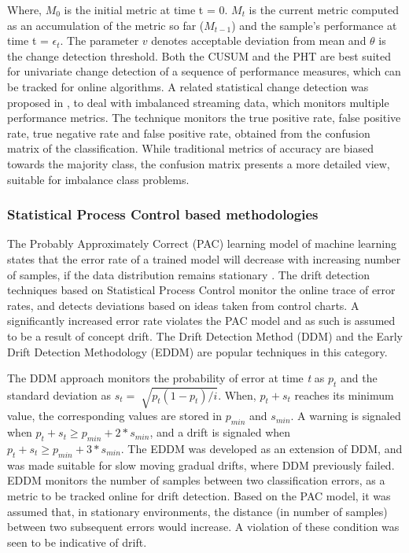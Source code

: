 \documentclass[authoryear,3p,times,twocolumn]{elsarticle}
\begin{document}
Where, $M_0$ is the initial metric at time t = 0. $M_t$ is the current metric computed as an accumulation of the metric so far ($M_{t-1}$) and the sample's performance at time t = $\epsilon_t$. The parameter $v$ denotes acceptable deviation from mean and $\theta$ is the change detection threshold. Both the CUSUM and the PHT are best suited for univariate change detection of a sequence of performance measures, which can be tracked for online algorithms. A related statistical change detection was proposed in \citep{wang2015concept}, to deal with imbalanced streaming data, which monitors multiple performance metrics. The technique monitors the true positive rate, false positive rate, true negative rate and false positive rate, obtained from the confusion matrix of the classification. While traditional metrics of accuracy are biased towards the majority class, the confusion matrix presents a more detailed view, suitable for imbalance class problems. 

\subsubsection{Statistical Process Control based methodologies}
\label{sec:lr_spc}

The Probably Approximately Correct (PAC) learning model of machine learning states that the error rate of a trained model will decrease with increasing number of samples, if the data distribution remains stationary \citep{haussler1990probably}. The drift detection techniques based on Statistical Process Control monitor the online trace of error rates, and detects deviations based on ideas taken from control charts. A significantly increased error rate violates the PAC model and as such is assumed to be a result of concept drift. The Drift Detection Method (DDM) \citep{gama2004learning} and the Early Drift Detection Methodology (EDDM) \citep{baena2006early} are popular techniques in this category. 

The DDM approach monitors the probability of error at time \textit{t} as $p_t$ and the standard deviation as $s_t=\sqrt[]{p_t(1-p_t)/i}$. When, $p_t+s_t$ reaches its minimum value, the corresponding values are stored in $p_{min}$ and $s_{min}$. A warning is signaled when $p_t+s_t \geq p_{min}+2*s_{min}$, and a drift is signaled when $p_t+s_t \geq p_{min}+3*s_{min}$. The EDDM was developed as an extension of DDM, and was made suitable for slow moving gradual drifts, where DDM previously failed. EDDM monitors the number of samples between two classification errors, as a metric to be tracked online for drift detection. Based on the PAC model, it was assumed that, in stationary environments, the distance (in number of samples) between two subsequent errors would increase. A violation of these condition was seen to be indicative of drift. 
\end{document}
